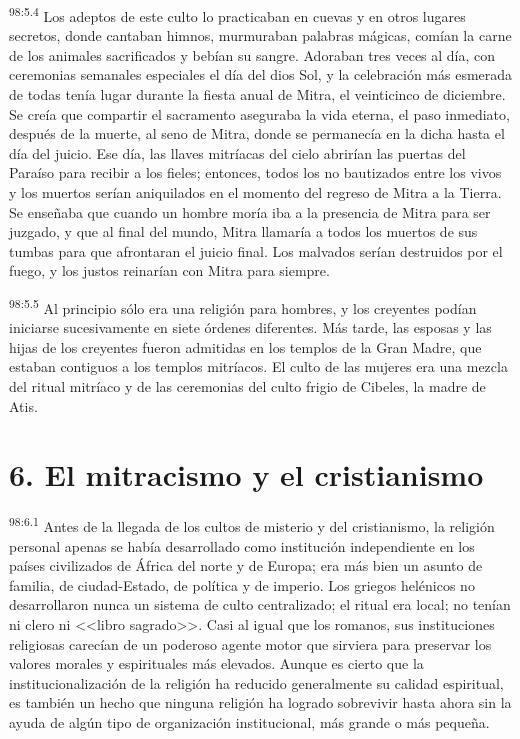 \par
\textsuperscript{98:5.4} Los adeptos de este culto lo practicaban en cuevas y en otros lugares secretos, donde cantaban himnos, murmuraban palabras mágicas, comían la carne de los animales sacrificados y bebían su sangre. Adoraban tres veces al día, con ceremonias semanales especiales el día del dios Sol, y la celebración más esmerada de todas tenía lugar durante la fiesta anual de Mitra, el veinticinco de diciembre. Se creía que compartir el sacramento aseguraba la vida eterna, el paso inmediato, después de la muerte, al seno de Mitra, donde se permanecía en la dicha hasta el día del juicio. Ese día, las llaves mitríacas del cielo abrirían las puertas del Paraíso para recibir a los fieles; entonces, todos los no bautizados entre los vivos y los muertos serían aniquilados en el momento del regreso de Mitra a la Tierra. Se enseñaba que cuando un hombre moría iba a la presencia de Mitra para ser juzgado, y que al final del mundo, Mitra llamaría a todos los muertos de sus tumbas para que afrontaran el juicio final. Los malvados serían destruidos por el fuego, y los justos reinarían con Mitra para siempre.

\par
\textsuperscript{98:5.5} Al principio sólo era una religión para hombres, y los creyentes podían iniciarse sucesivamente en siete órdenes diferentes. Más tarde, las esposas y las hijas de los creyentes fueron admitidas en los templos de la Gran Madre, que estaban contiguos a los templos mitríacos. El culto de las mujeres era una mezcla del ritual mitríaco y de las ceremonias del culto frigio de Cibeles, la madre de Atis.

\section*{6. El mitracismo y el cristianismo}
\par
\textsuperscript{98:6.1} Antes de la llegada de los cultos de misterio y del cristianismo, la religión personal apenas se había desarrollado como institución independiente en los países civilizados de África del norte y de Europa; era más bien un asunto de familia, de ciudad-Estado, de política y de imperio. Los griegos helénicos no desarrollaron nunca un sistema de culto centralizado; el ritual era local; no tenían ni clero ni <<libro sagrado>>. Casi al igual que los romanos, sus instituciones religiosas carecían de un poderoso agente motor que sirviera para preservar los valores morales y espirituales más elevados. Aunque es cierto que la institucionalización de la religión ha reducido generalmente su calidad espiritual, es también un hecho que ninguna religión ha logrado sobrevivir hasta ahora sin la ayuda de algún tipo de organización institucional, más grande o más pequeña.

